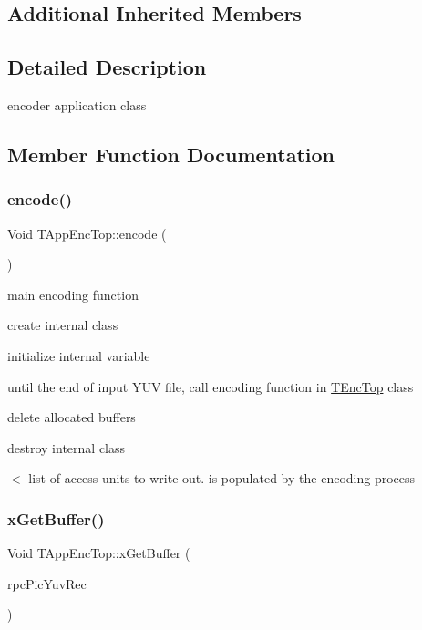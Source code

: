 \subsection*{Additional Inherited Members}


\subsection{Detailed Description}
encoder application class 

\subsection{Member Function Documentation}
\mbox{\label{class_t_app_enc_top_ae02a50c8958014ff024234cd454d6cf8}} 
\subsubsection{\texorpdfstring{encode()}{encode()}}
{\footnotesize\ttfamily Void T\+App\+Enc\+Top\+::encode (\begin{DoxyParamCaption}{ }\end{DoxyParamCaption})}



main encoding function 


\begin{DoxyItemize}
\item create internal class
\item initialize internal variable
\item until the end of input Y\+UV file, call encoding function in \hyperlink{class_t_enc_top}{T\+Enc\+Top} class
\item delete allocated buffers
\item destroy internal class
\end{DoxyItemize}$<$ list of access units to write out. is populated by the encoding process \mbox{\label{class_t_app_enc_top_a733e86171af314b24d237a78756e8d06}} 
\subsubsection{\texorpdfstring{x\+Get\+Buffer()}{xGetBuffer()}}
{\footnotesize\ttfamily Void T\+App\+Enc\+Top\+::x\+Get\+Buffer (\begin{DoxyParamCaption}\item[{\hyperlink{class_t_com_pic_yuv}{T\+Com\+Pic\+Yuv} $\ast$\&}]{rpc\+Pic\+Yuv\+Rec }\end{DoxyParamCaption})\hspace{0.3cm}{\ttfamily [protected]}}




